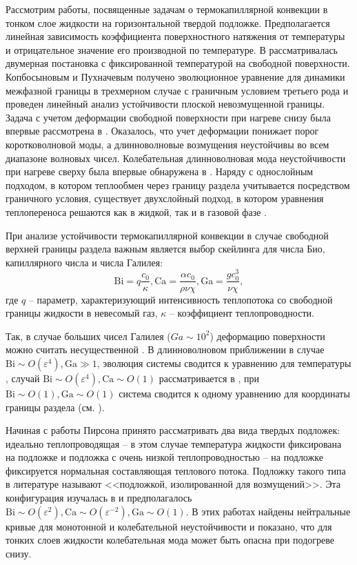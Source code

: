 \documentclass[12pt,a4paper]{article}
\begin{document}
Рассмотрим работы, посвященные задачам о термокапиллярной конвекции в тонком слое жидкости на горизонтальной твердой подложке. Предполагается линейная зависимость коэффициента поверхностного натяжения от температуры и отрицательное значение его производной по температуре.
В \cite{Pimputkar1980} рассматривалась двумерная постановка с фиксированной температурой на свободной поверхности. Копбосыновым и Пухначевым  \cite{Kopbosynov1983} получено эволюционное уравнение для динамики межфазной границы в трехмерном случае с граничным условием третьего рода и проведен линейный анализ устойчивости плоской невозмущенной границы.
Задача с учетом деформации свободной поверхности при нагреве снизу была впервые рассмотрена в  \cite{Scriven1964}. Оказалось, что учет деформации понижает порог коротковолновой моды, а длинноволновые возмущения неустойчивы во всем диапазоне волновых чисел. Колебательная длинноволновая мода неустойчивости при нагреве сверху была впервые обнаружена в \cite{Takashima1981}.
Наряду с однослойным подходом, в котором теплообмен через границу раздела учитывается посредством граничного условия, существует двухслойный подход, в котором уравнения теплопереноса решаются как в жидкой, так и в газовой фазе  \cite{VANHOOK1997, Golovin1995, GOLOVIN1997, Samoilova2015}.


При анализе устойчивости термокапиллярной конвекции в случае свободной верхней границы раздела важным является выбор скейлинга для числа Био, капиллярного числа и числа Галилея:
\[
\mathrm{Bi} = q \frac{c_0}{\kappa}, \mathrm{Ca} = \frac{\alpha c_0}{\rho \nu \chi}, \mathrm{Ga} = \frac{g c_0^3}{\nu \chi},
\]
где $q$ -- параметр, характеризующий интенсивность теплопотока со свободной границы жидкости в невесомый газ, $\kappa$ -- коэффициент теплопроводности.

Так, в случае больших чисел Галилея ($Ga \sim 10^2 $) \cite{Andreev2000} деформацию поверхности можно считать несущественной \cite{Nield1964, VANHOOK1997}. В длинноволновом приближении в случае $\mathrm{Bi} \sim O(\varepsilon^4), \mathrm{Ga} \gg 1$, эволюция системы сводится к уравнению для температуры \cite{Knobloch1990}, случай $\mathrm{Bi} \sim O(\varepsilon^4), \mathrm{Ca} \sim O(1)$ рассматривается в \cite{GarciaYbarra1987}, при   $\mathrm{Bi} \sim O(1), \mathrm{Ga} \sim O(1)$ система сводится к одному уравнению для координаты границы раздела (см. \cite{Oron1997, Samoilova2021}). 

Начиная с работы Пирсона \cite{Pearson1958} принято рассматривать два вида твердых подложек: идеально теплопроводящая -- в этом случае температура жидкости фиксирована на подложке и подложка с очень низкой теплопроводностью -- на подложке фиксируется нормальная составляющая теплового потока. Подложку такого типа в литературе называют <<подложкой, изолированной для возмущений>>. Эта конфигурация изучалась в \cite{Shklyaev2010, Shklyaev2012} и предполагалось $\mathrm{Bi} \sim O(\varepsilon^2), \mathrm{Ca} \sim O(\varepsilon^{-2}), \mathrm{Ga} \sim O(1)$. В этих работах найдены нейтральные кривые для монотонной и колебательной неустойчивости и показано, что для тонких слоев жидкости колебательная мода может быть опасна при подогреве снизу. 
\end{document}
